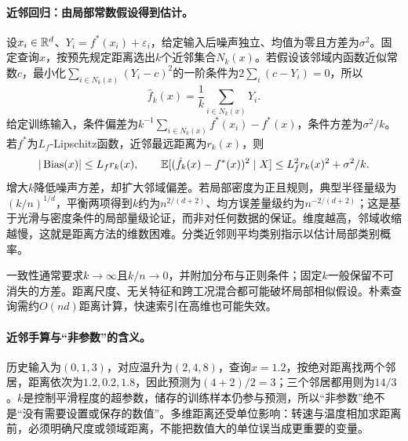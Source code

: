 \paragraph{近邻回归：由局部常数假设得到估计。}
设$x_i\in\mathbb{R}^d$、$Y_i=f^*(x_i)+\varepsilon_i$，给定输入后噪声独立、均值为零且方差为$\sigma^2$。固定查询$x$，按预先规定距离选出$k$个近邻集合$N_k(x)$。若假设该邻域内函数近似常数$c$，最小化$\sum_{i\in N_k(x)}(Y_i-c)^2$的一阶条件为$2\sum_i(c-Y_i)=0$，所以
\begin{equation}
 \hat f_k(x)=\frac1k\sum_{i\in N_k(x)}Y_i.
\end{equation}
给定训练输入，条件偏差为$k^{-1}\sum_{i\in N_k(x)}f^*(x_i)-f^*(x)$，条件方差为$\sigma^2/k$。若$f^*$为$L_f$-Lipschitz函数，近邻最远距离为$r_k(x)$，则
\begin{equation}
 |\operatorname{Bias}(x)|\leq L_fr_k(x),\qquad
 \mathbb{E}[(\hat f_k(x)-f^*(x))^2\mid X]\leq L_f^2r_k(x)^2+\sigma^2/k.
\end{equation}
增大$k$降低噪声方差，却扩大邻域偏差。若局部密度为正且规则，典型半径量级为$(k/n)^{1/d}$，平衡两项得到$k$约为$n^{2/(d+2)}$、均方误差量级约为$n^{-2/(d+2)}$；这是基于光滑与密度条件的局部量级论证，而非对任何数据的保证。维度越高，邻域收缩越慢，这就是距离方法的维数困难。分类近邻则平均类别指示以估计局部类别概率。

一致性通常要求$k\to\infty$且$k/n\to0$，并附加分布与正则条件；固定$k$一般保留不可消失的方差。距离尺度、无关特征和跨工况混合都可能破坏局部相似假设。朴素查询需约$O(nd)$距离计算，快速索引在高维也可能失效。

\paragraph{近邻手算与“非参数”的含义。}
历史输入为$(0,1,3)$，对应温升为$(2,4,8)$，查询$x=1.2$，按绝对距离找两个邻居，距离依次为$1.2,0.2,1.8$，因此预测为$(4+2)/2=3$；三个邻居都用则为$14/3$。$k$是控制平滑程度的超参数，储存的训练样本仍参与预测，所以“非参数”绝不是“没有需要设置或保存的数值”。多维距离还受单位影响：转速与温度相加求距离前，必须明确尺度或领域距离，不能把数值大的单位误当成更重要的变量。


